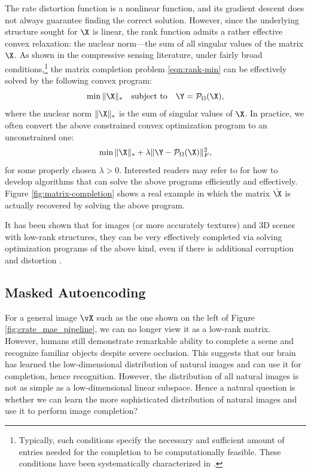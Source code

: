 \documentclass[../../book-main.tex]{subfiles}
\begin{document}
The rate distortion function is a nonlinear function, and its gradient
descent does not always guarantee finding the correct solution.
However, since the underlying structure sought for $\X$ is linear,
the rank function admits a rather effective convex relaxation: the
nuclear norm---the sum of all singular values of the matrix $\X$. As
shown in the compressive sensing literature, under fairly
broad conditions,\footnote{Typically, such conditions specify the
necessary and sufficient amount of entries needed for the completion
to be computationally feasible. These conditions have been
systematically characterized in \cite{Wright-Ma-2022}.} the matrix
completion problem \eqref{eqn:rank-min}
can be effectively solved by the following convex program:
\begin{equation}
\min \|\X\|_* \quad \mbox{subject to}
\quad
\Y = \mathcal{P}_{\Omega}(\X),
\label{eqn:nuclear-min}
\end{equation}
where the nuclear norm $\|\X\|_*$ is the sum of singular values of
$\X$. In practice, we often convert the above constrained convex optimization
program to an unconstrained one:
\begin{equation}
\min \|\X\|_*  + \lambda \|
\Y - \mathcal{P}_{\Omega}(\X)\|_F^2,
\label{eqn:nuclear-min-lagrangian}
\end{equation}
for some properly chosen $\lambda > 0$. Interested readers may refer to
\cite{Wright-Ma-2022} for how to develop algorithms  that can solve
the above programs  efficiently and effectively.
Figure \ref{fig:matrix-completion} shows a real example in which the
matrix $\hat \X$ is actually recovered by solving the above program.

It has been shown that for images (or more accurately textures) and 3D scenes
with low-rank structures, they can be very effectively completed via
solving optimization programs of the above kind, even if there is
additional corruption and distortion
\cite{Zhang2010TILTTI,Liang-ECCV2012,Yi_2023_ICCV}.

\subsection{Masked Autoencoding}
For a general image $\vX$ such as the one shown on the left of Figure
\ref{fig:crate_mae_pipeline}, we can no longer view it as a low-rank
matrix. However, humans still demonstrate remarkable ability to
complete a scene and recognize familiar objects despite severe
occlusion. This suggests that our brain has learned the
low-dimensional distribution of natural images and can use it for
completion, hence recognition. However, the distribution of all
natural images is not as simple as a low-dimensional linear subspace.
Hence a natural question is whether we can learn the more
sophisticated distribution of natural images and use it to perform
image completion?
\end{document}
